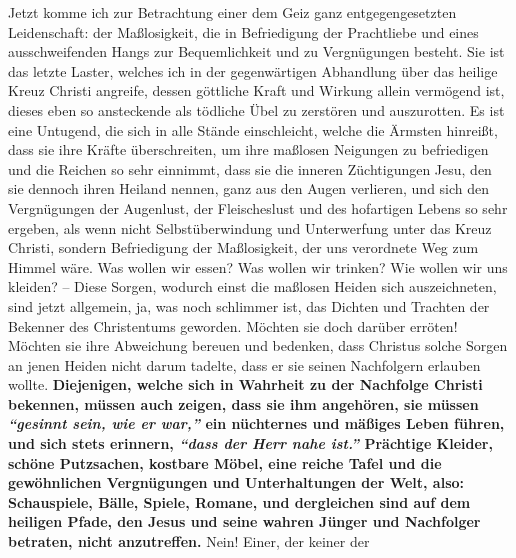 Jetzt komme ich zur Betrachtung einer dem Geiz ganz entgegengesetzten
Leidenschaft: der Maßlosigkeit, die in Befriedigung der Prachtliebe und
eines
ausschweifenden Hangs zur
Bequemlichkeit und zu Vergnügungen
besteht. Sie ist
das letzte Laster, welches ich in der gegenwärtigen Abhandlung
über das heilige
Kreuz Christi angreife, dessen göttliche Kraft und Wirkung allein vermögend ist,
dieses eben so ansteckende als tödliche Übel zu
zerstören und auszurotten. Es
ist eine Untugend, die sich in alle Stände einschleicht, welche
die Ärmsten
hinreißt, dass sie ihre Kräfte überschreiten, um ihre
maßlosen Neigungen zu
befriedigen und die Reichen so sehr einnimmt, dass sie die inneren Züchtigungen
Jesu, den sie dennoch ihren
Heiland nennen, ganz aus den Augen verlieren, und sich
den Vergnügungen der Augenlust, der
Fleischeslust und des
hofartigen Lebens so
sehr ergeben, als wenn nicht
Selbstüberwindung
 und Unterwerfung
unter das Kreuz
Christi, sondern Befriedigung der Maßlosigkeit,
der uns verordnete Weg zum Himmel
wäre. Was wollen wir essen? Was wollen wir trinken? Wie wollen wir uns kleiden?
-- Diese Sorgen, wodurch einst die maßlosen
Heiden sich auszeichneten, sind jetzt
allgemein, ja, was noch schlimmer ist, das Dichten und Trachten
der Bekenner des
Christentums geworden. Möchten sie doch darüber erröten! Möchten sie ihre
Abweichung bereuen und bedenken, dass Christus solche
Sorgen an jenen Heiden
nicht darum tadelte, dass er sie seinen Nachfolgern erlauben wollte.
\label{ref:14_01_wahre_nachfolger} \textbf{Diejenigen,
welche sich in Wahrheit zu der Nachfolge Christi bekennen, müssen auch zeigen,
dass sie ihm angehören, sie müssen
\textit{"`gesinnt sein, wie er war,"'} ein nüchternes
und mäßiges Leben führen, und sich stets erinnern,
\textit{"`dass der Herr nahe ist."'}
Prächtige Kleider, schöne Putzsachen, kostbare
Möbel,
eine reiche Tafel und die
gewöhnlichen Vergnügungen und
Unterhaltungen der Welt,
also: Schauspiele, Bälle,
Spiele, Romane, und dergleichen sind auf dem
heiligen Pfade,
den Jesus und seine wahren
Jünger und Nachfolger betraten, nicht anzutreffen.} Nein! Einer, der keiner der
